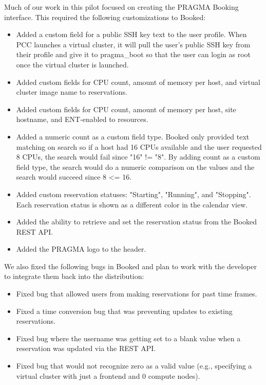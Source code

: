 \documentclass{acm_proc_article-sp}
\begin{document}
Much of our work in this pilot focused on creating the PRAGMA Booking interface.  This required the following customizations to Booked:

\begin{itemize}
\item Added a custom field for a public SSH key text  to the user profile.  When PCC launches a virtual cluster, it will pull the user's public SSH key from their profile and give it to pragma\_boot so that the user can login as root once the virtual cluster is launched.   
\item Added custom fields for CPU count, amount of memory per host, and virtual cluster image name to reservations.
\item Added custom fields for CPU count, amount of memory per host, site hostname, and ENT-enabled to resources.
\item Added a numeric count as a custom field type.  Booked only provided text matching on search so if a host had 16 CPUs available and the user requested 8 CPUs, the search would fail since "16" != "8".  By adding count as a custom field type, the search would do a numeric comparison on the values and the search would succeed since 8 <= 16.
\item Added custom reservation statuses: "Starting", "Running", and "Stopping".  Each reservation status is shown as a different color in  the calendar view.
\item Added the ability to retrieve and set the reservation status from the Booked REST API.  	
\item Added the PRAGMA logo to the header.
\end{itemize}

We also fixed the following bugs in Booked and plan to work with the developer to integrate them back into the distribution:

\begin{itemize}
\item Fixed bug that allowed users from making reservations for past time frames.
\item Fixed a time conversion bug that was preventing updates to existing reservations.
\item Fixed bug where the username was getting set to a blank value when a reservation was updated via the REST API. 
\item Fixed bug that would not recognize zero as a valid value (e.g., specifying a virtual cluster with just a frontend and 0 compute nodes).  
\end{itemize}
\end{document}
